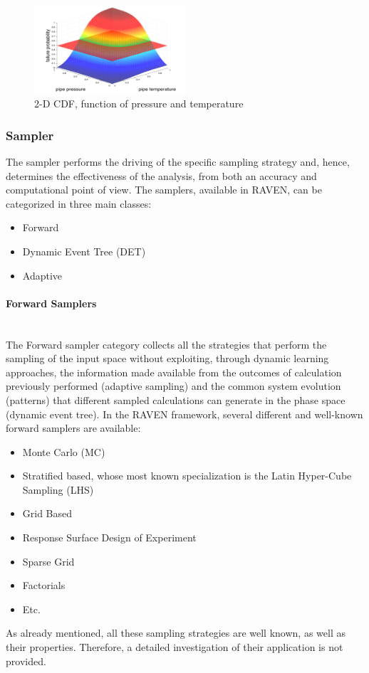 \begin{figure}
  \centering
  \includegraphics[width=0.5\textwidth]  {pics/NDimensionalDistributionExample.png}
  \caption{2-D CDF, function of pressure and temperature}
  \label{fig:NDDistributionExample}
\end{figure}

\subsubsection{Sampler}
The sampler performs the driving of the specific sampling strategy and, hence, determines the effectiveness of the 
analysis, from both an accuracy and computational point of view.  The samplers, available in RAVEN, can be 
categorized in three main classes:
\begin{itemize}
 \item Forward
 \item Dynamic Event Tree (DET)
 \item Adaptive
\end{itemize}
\paragraph{Forward Samplers} ~\\
The Forward sampler category collects all the strategies that perform the sampling of the input space without exploiting, 
through dynamic learning approaches, the information made available from the outcomes of calculation previously 
performed (adaptive sampling) and the common system evolution (patterns) that different sampled calculations can 
generate in the phase space (dynamic event tree).
In the RAVEN framework, several different and well-known forward samplers are available:
\begin{itemize}
\item Monte Carlo (MC)
\item Stratified based, whose most known specialization is the Latin Hyper-Cube Sampling (LHS)
\item Grid Based
\item Response Surface Design of Experiment
\item Sparse Grid
\item Factorials
\item Etc.
\end{itemize}
As already mentioned, all these sampling strategies are well known, as well as their properties. Therefore, a detailed 
investigation of their application is not provided.

